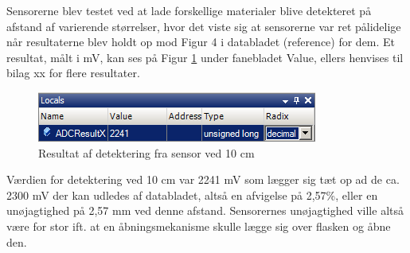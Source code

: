 Sensorerne blev testet ved at lade forskellige materialer blive detekteret på afstand af varierende størrelser, hvor det viste sig at sensorerne var ret pålidelige når resultaterne blev holdt op mod Figur 4 i databladet (reference) for dem. Et resultat, målt i mV, kan ses på Figur \ref{Sensor_10cm} under fanebladet Value, ellers henvises til bilag xx for flere resultater.

\begin{figure}[H]
	\caption{Resultat af detektering fra sensor ved 10 cm}
	\label{Sensor_10cm}
	\includegraphics[scale=1]{tex/TeImRe/Hardware/Sensor_10cm.png}
\end{figure}

Værdien for detektering ved 10 cm var 2241 mV som lægger sig tæt op ad de ca. 2300 mV der kan udledes af databladet, altså en afvigelse på 2,57\%, eller en unøjagtighed på 2,57 mm ved denne afstand. Sensorernes unøjagtighed ville altså være for stor ift. at en åbningsmekanisme skulle lægge sig over flasken og åbne den.